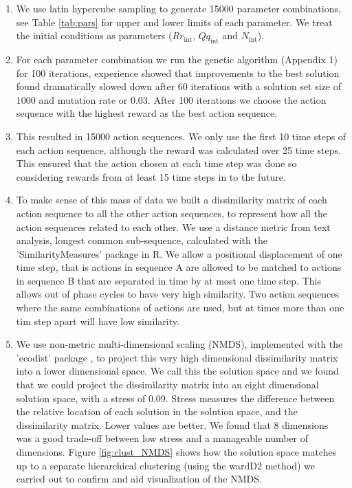 \documentclass[12pt, a4paper]{article}
\begin{document}
\begin{enumerate}
\item We use latin hypercube sampling to generate 15000 parameter combinations, see Table \ref{tab:pars} for upper and lower limits of each parameter. We treat the initial conditions as parameters ($Rr_\text{int}$, $Qq_\text{int}$ and $N_\text{int}$). 
\item For each parameter combination we run the genetic algorithm (Appendix 1) for 100 iterations, experience showed that improvements to the best solution found dramatically slowed down after 60 iterations with a solution set size of 1000 and mutation rate or 0.03. After 100 iterations we choose the action sequence with the highest reward as the best action sequence.     
\item This resulted in 15000 action sequences. We only use the first 10 time steps of each action sequence, although the reward was calculated over 25 time steps. This ensured that the action chosen at each time step was done so considering rewards from at least 15 time steps in to the future. 
\item To make sense of this mass of data we built a dissimilarity matrix of each action sequence to all the other action sequences, to represent how all the action sequences related to each other. We use a distance metric from text analysis, longest common sub-sequence, calculated with the 'SimilarityMeasures' \citep{Tooh2015} package in R. We allow a positional displacement of one time step, that is actions in sequence A are allowed to be matched to actions in sequence B that are separated in time by at most one time step. This allows out of phase cycles to have very high similarity. Two action sequences where the same combinations of actions are used, but at times more than one tim step apart will have low similarity. 
\item We use non-metric multi-dimensional scaling (NMDS), implemented with the 'ecodist' package \citep{Gosl2007}, to project this very high dimensional dissimilarity matrix into a lower dimensional space. We call this the solution space and we found that we could project the dissimilarity matrix into an eight dimensional solution space, with a stress of 0.09. Stress measures the difference between the relative location of each solution in the solution space, and the dissimilarity matrix. Lower values are better. We found that 8 dimensions was a good trade-off between low stress and a manageable number of dimensions. Figure \ref{fig:clust_NMDS} shows how the solution space matches up to a separate hierarchical clustering (using the wardD2 method) we carried out to confirm and aid visualization of the NMDS.                  

\end{enumerate}
\end{document}
